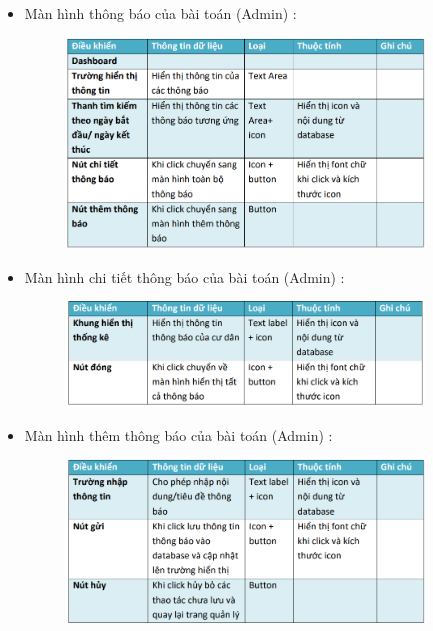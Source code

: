 \documentclass{article}
\begin{document}
\begin{itemize}
\begin{figure}[H]
    \end{figure}
    \item Màn hình thông báo của bài toán (Admin) :
    \begin{figure}[H]
        \centering
        \includegraphics[width=0.9\textwidth]{Ảnh chương 4/Thông báo Admin.png}
    \end{figure}
    \item Màn hình chi tiết thông báo của bài toán (Admin) :
    \begin{figure}[H]
        \centering
        \includegraphics[width=0.9\textwidth]{Ảnh chương 4/Chi tiết thông báo.png}
    \end{figure}
    \item Màn hình thêm thông báo của bài toán (Admin) :
    \begin{figure}[H]
        \centering
        \includegraphics[width=0.9\textwidth]{Ảnh chương 4/Thêm thông báo Admin.png}
    \end{figure}

\end{itemize}
\end{document}
